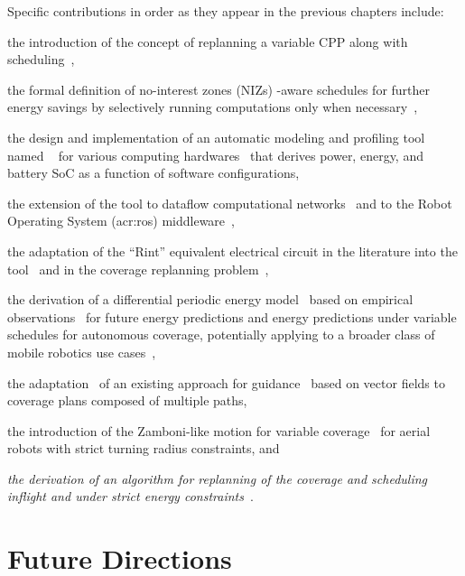 Specific contributions in order as they appear in the previous chapters include:
\begin{enumerate*}[label={(\alph*)},font={\textit}]
  \item the introduction of the concept of replanning a variable CPP along with scheduling~\citep{seewald202Xenergy},
  \item the formal definition of no-interest zones (NIZs) -aware schedules for further energy savings by selectively running computations only when necessary~\citep{seewald202Xenergy},
  \item the design and implementation of an automatic modeling and profiling tool named \powprof{}~\citep{seewald2019coarse} for various computing hardwares~\citep{powprofiler} that derives power, energy, and battery SoC as a function of software configurations,
  \item the extension of the \powprof{} tool to dataflow computational networks~\citep{seewald2019component} and to the Robot Operating System (\Gls{acr:ros}) middleware~\citep{zamanakos2020energy},
  \item the adaptation of the ``Rint'' equivalent electrical circuit in the literature into the \powprof{} tool~\citep{seewald2019coarse} and in the coverage replanning problem~\citep{seewald202Xenergy},
  \item the derivation of a differential periodic energy model~\citep{seewald202Xenergy} based on empirical observations~\citep{seewald2020mechanical} for future energy predictions and energy predictions under variable schedules for autonomous coverage, potentially applying to a broader class of mobile robotics use cases~\citep{seewald2020beyond},
  \item the adaptation~\citep{seewald202Xenergy} of an existing approach for guidance~\citep{de2017guidance} based on vector fields to coverage plans composed of multiple paths,
  \item the introduction of the Zamboni-like motion for variable coverage~\citep{seewald202Xenergy} for aerial robots with strict turning radius constraints, and
  \item {\itshape the derivation of an algorithm for replanning of the coverage and scheduling inflight and under strict energy constraints}~\citep{seewald202Xenergy}.
\end{enumerate*} 


\section{Future Directions}
\label{sec:conc-future}

